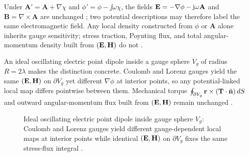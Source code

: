 Under \(\mathbf{A}'=\mathbf{A}+\nabla\chi\) and \(\phi'=\phi-\jj\omega\chi\), the fields \(\mathbf{E}=-\nabla\phi-\mathrm{j}\omega\mathbf{A}\) and \(\mathbf{B}=\nabla\times\mathbf{A}\) are unchanged \cite{maxwell1873}; two potential descriptions may therefore label the same electromagnetic field. Any local density constructed from \(\phi\) or \(\mathbf{A}\) alone inherits gauge sensitivity; stress traction, Poynting flux, and total angular-momentum density built from \((\mathbf{E},\mathbf{H})\) do not \cite{belinfante1940,stratton1941}.

An ideal oscillating electric point dipole inside a gauge sphere $V_g$ of radius $R=2\lambda$ makes the distinction concrete. Coulomb and Lorenz gauges yield the same $(\mathbf{E},\mathbf{H})$ on $\partial V_g$ yet different $\nabla\phi$ at interior points, so any potential-linked local map differs pointwise between them. Mechanical torque $\oint_{\partial V_g}\mathbf{r}\times(\mathbf{T}\cdot\hat{\mathbf{n}})\,dS$ and outward angular-momentum flux built from $(\mathbf{E},\mathbf{H})$ remain unchanged \cite{belinfante1940,stratton1941}.

\begin{figure}[t]
\centering
{}
\caption{Ideal oscillating electric point dipole inside gauge sphere $V_g$: Coulomb and Lorenz gauges yield different gauge-dependent local maps at interior points while identical $(\mathbf{E},\mathbf{H})$ on $\partial V_g$ fixes the same stress-flux integral \cite{belinfante1940,stratton1941}.}
\label{fig:ch1.ex63-gauge-volume-sketch}
\end{figure}


